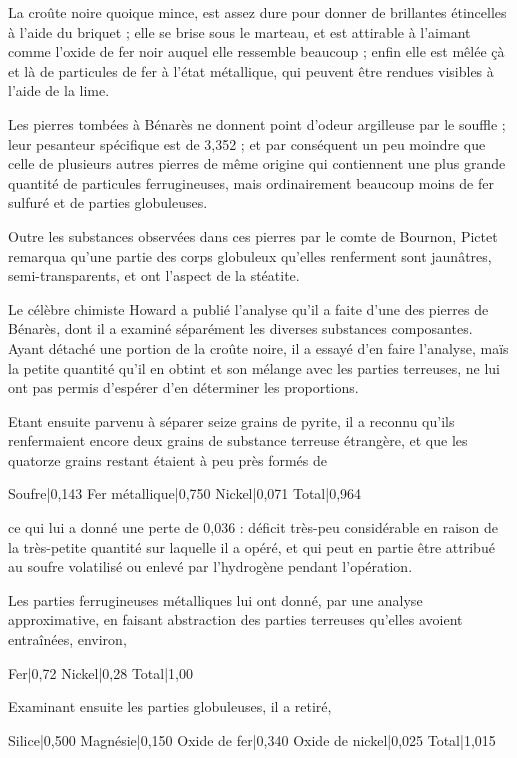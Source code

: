 \documentclass[a4paper, 12pt, oneside, french]{article}
\begin{document}
La croûte noire quoique mince, est assez dure pour donner de brillantes étincelles à l'aide du briquet ; elle se brise sous le marteau, et est attirable à l'aimant comme l'oxide de fer noir auquel elle ressemble beaucoup ; enfin elle est mêlée çà et là de particules de fer à l'état métallique, qui peuvent être rendues visibles à l'aide de la lime.

Les pierres tombées à Bénarès ne donnent point d'odeur argilleuse par le souffle ; leur pesanteur spécifique est de 3,352 ; et par conséquent un peu moindre que celle de plusieurs autres pierres de même origine qui contiennent une plus grande quantité de particules ferrugineuses, mais ordinairement beaucoup moins de fer sulfuré et de parties globuleuses.

Outre les substances observées dans ces pierres par le comte de Bournon, Pictet remarqua qu'une partie des corps globuleux qu'elles renferment sont jaunâtres, semi-transparents, et ont l'aspect de la stéatite.

Le célèbre chimiste Howard a publié l'analyse qu'il a faite d'une des pierres de Bénarès, dont il a examiné séparément les diverses substances composantes. Ayant détaché une portion de la croûte noire, il a essayé d'en faire l'analyse, maïs la petite quantité qu'il en obtint et son mélange avec les parties terreuses, ne lui ont pas permis d'espérer d'en déterminer les proportions.

Etant ensuite parvenu à séparer seize grains de pyrite, il a reconnu qu'ils renfermaient encore deux grains de substance terreuse étrangère, et que les quatorze grains restant étaient à peu près formés de

Soufre|0,143  
Fer métallique|0,750  
Nickel|0,071  
Total|0,964

ce qui lui a donné une perte de 0,036 : déficit très-peu considérable en raison de la très-petite quantité sur laquelle il a opéré, et qui peut en partie être attribué au soufre volatilisé ou enlevé par l'hydrogène pendant l'opération.

Les parties ferrugineuses métalliques lui ont donné, par une analyse approximative, en faisant abstraction des parties terreuses qu'elles avoient entraînées, environ,

Fer|0,72  
Nickel|0,28  
Total|1,00

Examinant ensuite les parties globuleuses, il a retiré,

Silice|0,500  
Magnésie|0,150  
Oxide de fer|0,340  
Oxide de nickel|0,025  
Total|1,015
\end{document}

